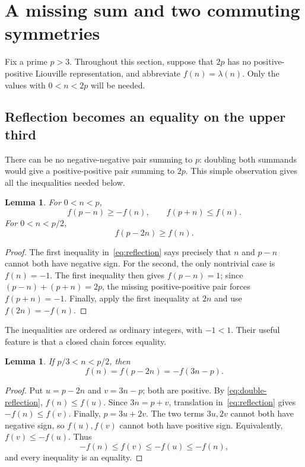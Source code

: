 \documentclass[11pt,a4paper]{article}
\newtheorem{lemma}[theorem]{Lemma}
\theoremstyle{remark}
\numberwithin{equation}{section}
\newcommand{\lam}{\lambda}
\begin{document}
\section{A missing sum and two commuting symmetries}\label{sec:symmetry}

Fix a prime \(p>3\). Throughout this section, suppose that \(2p\) has no
positive-positive Liouville representation, and abbreviate \(f(n)=\lam(n)\).
Only the values with \(0<n<2p\) will be needed.

\subsection{Reflection becomes an equality on the upper third}

There can be no negative-negative pair summing to \(p\): doubling both
summands would give a positive-positive pair summing to \(2p\). This simple
observation gives all the inequalities needed below.

\begin{lemma}\label{lem:reflection}
For \(0<n<p\),
\begin{equation}\label{eq:reflection}
  f(p-n)\ge-f(n),\qquad f(p+n)\le f(n).
\end{equation}
For \(0<n<p/2\),
\begin{equation}\label{eq:double-reflection}
  f(p-2n)\ge f(n).
\end{equation}
\end{lemma}

\begin{proof}
The first inequality in~\eqref{eq:reflection} says precisely that \(n\)
and \(p-n\) cannot both have negative sign. For the second, the only
nontrivial case is \(f(n)=-1\). The first inequality then gives
\(f(p-n)=1\); since \((p-n)+(p+n)=2p\), the missing positive-positive
pair forces \(f(p+n)=-1\).
Finally, apply the first inequality at \(2n\) and use
\(f(2n)=-f(n)\).
\end{proof}

The inequalities are ordered as ordinary integers, with \(-1<1\). Their
useful feature is that a closed chain forces equality.

\begin{lemma}\label{lem:upper}
If \(p/3<n<p/2\), then
\begin{equation}\label{eq:upper}
  f(n)=f(p-2n)=-f(3n-p).
\end{equation}
\end{lemma}

\begin{proof}
Put \(u=p-2n\) and \(v=3n-p\); both are positive. By
\eqref{eq:double-reflection}, \(f(n)\le f(u)\). Since \(3n=p+v\),
translation in~\eqref{eq:reflection} gives \(-f(n)\le f(v)\).
Finally, \(p=3u+2v\). The two terms \(3u,2v\) cannot both have
negative sign, so \(f(u),f(v)\) cannot both have positive sign.
Equivalently, \(f(v)\le-f(u)\). Thus
\[
  -f(n)\le f(v)\le-f(u)\le-f(n),
\]
and every inequality is an equality.
\end{proof}
\end{document}
